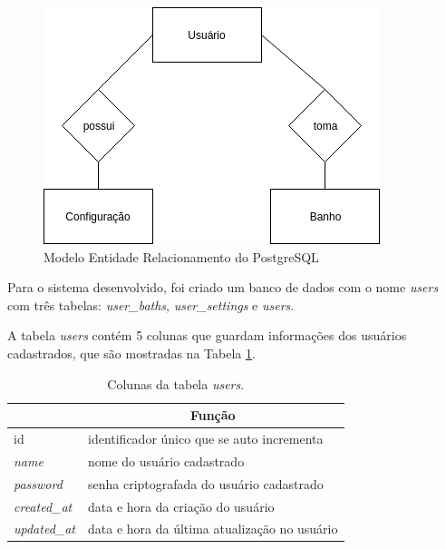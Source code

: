 \begin{figure}[htbp]
	\centering
	\includegraphics[width=0.6\linewidth]{figuras/ERPostgre.png}
	\caption{Modelo Entidade Relacionamento do PostgreSQL}
	\label{fig:erpostgre}
\end{figure}

\newpage

Para o sistema desenvolvido, foi criado um banco de dados com o nome \textit{users} com três tabelas: \textit{user\_baths}, \textit{user\_settings} e \textit{users}.

A tabela \textit{users} contém 5 colunas que guardam informações dos usuários cadastrados, que são mostradas na Tabela \ref{tab:users}.


\begin{table}[]
	\centering
	\begin{tabular}{|l|l|}
		\hline
		\rowcolor[HTML]{ECF4FF} 
		\multicolumn{1}{|c|}{\cellcolor[HTML]{ECF4FF}Coluna} & \multicolumn{1}{c|}{\cellcolor[HTML]{ECF4FF}Função} \\ \hline
		id                                                   & identificador único que se auto incrementa          \\ \hline
		\textit{name}                                        & nome do usuário cadastrado                          \\ \hline
		\textit{password}                                    & senha criptografada do usuário cadastrado           \\ \hline
		\textit{created\_at}                                 & data e hora da criação do usuário                   \\ \hline
		\textit{updated\_at}                                 & data e hora da última atualização no usuário        \\ \hline
	\end{tabular}
	\caption{Colunas da tabela \textit{users}.}
	\label{tab:users}
\end{table}

